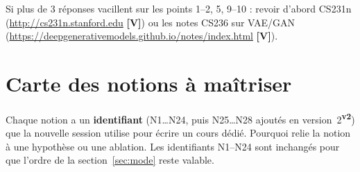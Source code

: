 \documentclass[11pt,a4paper]{article}
\providecommand{\og}{\guillemotleft\nobreakspace}%
\providecommand{\fg}{\nobreakspace\guillemotright}}
\newcommand{\vtwo}{\textsuperscript{\textcolor{orange!80!black}{\textbf{v2}}}}
\newcommand{\lV}{\textbf{\textcolor{green!45!black}{[V]}}}
\begin{document}
Si plus de 3 réponses vacillent sur les points 1--2, 5, 9--10 : revoir d'abord CS231n (\url{http://cs231n.stanford.edu} \lV) ou les notes CS236 sur VAE/GAN (\url{https://deepgenerativemodels.github.io/notes/index.html} \lV).

\section{Carte des notions à maîtriser}\label{sec:notions}

Chaque notion a un \textbf{identifiant} (N1\ldots N24, puis N25\ldots N28 ajoutés en version~2\vtwo) que la nouvelle session utilise pour écrire un cours dédié. \og{}Pourquoi\fg{} relie la notion à une hypothèse ou une ablation. Les identifiants N1--N24 sont inchangés pour que l'ordre de la section~\ref{sec:mode} reste valable.
\end{document}
